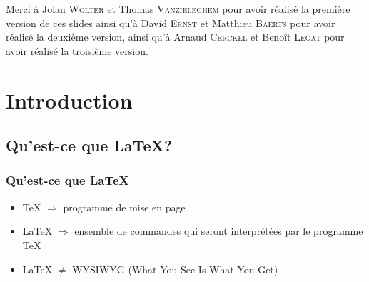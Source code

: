 \documentclass[10pt,svgnames,usenames,table]{beamer} %
\begin{document}
\begin{frame}
  \maketitle
  Merci à Jolan \textsc{Wolter} et Thomas \textsc{Vanzieleghem} pour avoir réalisé la première version de ces slides
  ainsi qu'à David \textsc{Ernst} et Matthieu \textsc{Baerts} pour avoir réalisé la deuxième version, ainsi qu'à Arnaud \textsc{Cerckel} et Benoît \textsc{Legat} pour avoir réalisé la troisième version.
\end{frame}


\section{Introduction}
\subsection{Qu'est-ce que \LaTeX{}?}
\begin{frame}
\frametitle{Qu'est-ce que \LaTeX}

\begin{itemize}
\item \TeX{} $ \Rightarrow$ programme de mise en page
\vspace{0.5cm}
\item \LaTeX{} $ \Rightarrow$ ensemble de commandes qui seront
 interprétées par le programme \TeX
 \vspace{0.5cm}
\item \LaTeX{} $ \neq$ WYSIWYG (What You See Is What You Get)
\end{itemize}

\end{frame}
\end{document}
